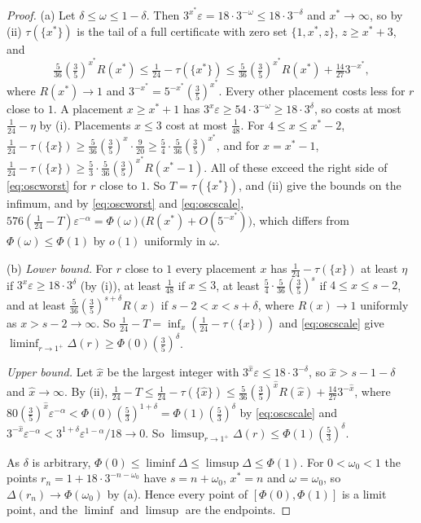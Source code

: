 \documentclass[11pt]{article}
\begin{document}
\begin{proof}
(a) Let $\delta\le\omega\le1-\delta$.  Then
$3^{x^*}\varepsilon=18\cdot3^{-\omega}\le18\cdot3^{-\delta}$ and
$x^*\to\infty$, so by (ii) $\tau(\{x^*\})$ is the tail of a full certificate
with zero set $\{1,x^*,z\}$, $z\ge x^*+3$, and
\begin{equation}\label{eq:oscworst}
  \tfrac5{36}(\tfrac35)^{x^*}R(x^*)\le\tfrac1{24}-\tau(\{x^*\})
  \le\tfrac5{36}(\tfrac35)^{x^*}R(x^*)+\tfrac{14}{27}3^{-x^*},
\end{equation}
where $R(x^*)\to1$ and $3^{-x^*}=5^{-x^*}(\tfrac35)^{x^*}$.  Every other
placement costs less for $r$ close to $1$.  A placement $x\ge x^*+1$ has
$3^x\varepsilon\ge54\cdot3^{-\omega}\ge18\cdot3^\delta$, so costs at most
$\tfrac1{24}-\eta$ by (i).  Placements $x\le3$ cost at most
$\tfrac1{48}$.  For $4\le x\le x^*-2$,
$\tfrac1{24}-\tau(\{x\})\ge\tfrac5{36}(\tfrac35)^x\cdot\tfrac9{20}
\ge\tfrac54\cdot\tfrac5{36}(\tfrac35)^{x^*}$, and for $x=x^*-1$,
$\tfrac1{24}-\tau(\{x\})\ge\tfrac53\cdot\tfrac5{36}(\tfrac35)^{x^*}R(x^*-1)$.
All of these exceed the right side of \eqref{eq:oscworst} for $r$ close to
$1$.  So $T=\tau(\{x^*\})$, \cite[Theorem~3.1]{coefficient-mass-attainment} and (ii) give the bounds
on the infimum, and by \eqref{eq:oscworst} and \eqref{eq:oscscale},
$576(\tfrac1{24}-T)\varepsilon^{-\alpha}=\Phi(\omega)\bigl(R(x^*)+O(5^{-x^*})\bigr)$,
which differs from $\Phi(\omega)\le\Phi(1)$ by $o(1)$ uniformly in $\omega$.

(b) \emph{Lower bound.}  For $r$ close to $1$ every placement $x$ has
$\tfrac1{24}-\tau(\{x\})$ at least $\eta$ if $3^x\varepsilon\ge18\cdot3^\delta$
(by (i)), at least $\tfrac1{48}$ if $x\le3$, at least
$\tfrac54\cdot\tfrac5{36}(\tfrac35)^s$ if $4\le x\le s-2$, and at least
$\tfrac5{36}(\tfrac35)^{s+\delta}R(x)$ if $s-2<x<s+\delta$, where
$R(x)\to1$ uniformly as $x>s-2\to\infty$.  So
$\tfrac1{24}-T=\inf_x(\tfrac1{24}-\tau(\{x\}))$ and \eqref{eq:oscscale} give
$\liminf_{r\to1^+}\Delta(r)\ge\Phi(0)(\tfrac35)^\delta$.

\emph{Upper bound.}  Let $\hat x$ be the largest integer with
$3^{\hat x}\varepsilon\le18\cdot3^{-\delta}$, so $\hat x>s-1-\delta$ and
$\hat x\to\infty$.  By (ii),
$\tfrac1{24}-T\le\tfrac1{24}-\tau(\{\hat x\})\le\tfrac5{36}(\tfrac35)^{\hat x}R(\hat x)
+\tfrac{14}{27}3^{-\hat x}$, where
$80(\tfrac35)^{\hat x}\varepsilon^{-\alpha}<\Phi(0)(\tfrac53)^{1+\delta}
=\Phi(1)(\tfrac53)^\delta$ by \eqref{eq:oscscale} and
$3^{-\hat x}\varepsilon^{-\alpha}<3^{1+\delta}\varepsilon^{1-\alpha}/18\to0$.
So $\limsup_{r\to1^+}\Delta(r)\le\Phi(1)(\tfrac53)^\delta$.

As $\delta$ is arbitrary, $\Phi(0)\le\liminf\Delta\le\limsup\Delta\le\Phi(1)$.
For $0<\omega_0<1$ the points $r_n=1+18\cdot3^{-n-\omega_0}$ have $s=n+\omega_0$,
$x^*=n$ and $\omega=\omega_0$, so $\Delta(r_n)\to\Phi(\omega_0)$ by (a).
Hence every point of $[\Phi(0),\Phi(1)]$ is a limit point, and the
$\liminf$ and $\limsup$ are the endpoints.
\end{proof}
\end{document}
